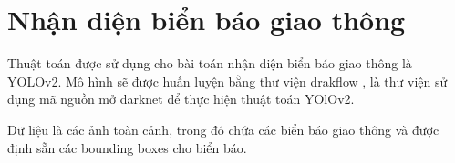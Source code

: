 \section{Nhận diện biển báo giao thông}
Thuật toán được sử dụng cho bài toán nhận diện biển báo giao thông là YOLOv2. Mô hình sẽ được huấn luyện bằng thư viện drakflow \cite{drakflow}, là thư viện sử dụng mã nguồn mở darknet\cite{darknet13} để thực hiện thuật toán YOlOv2.\par
Dữ liệu là các ảnh toàn cảnh, trong đó chứa các biển báo giao thông và được định sẵn các bounding boxes cho biển báo.
\begin{figure}[H]
\centering
{} \hspace{3mm}
\\
 \hspace{3mm}

\end{figure}
